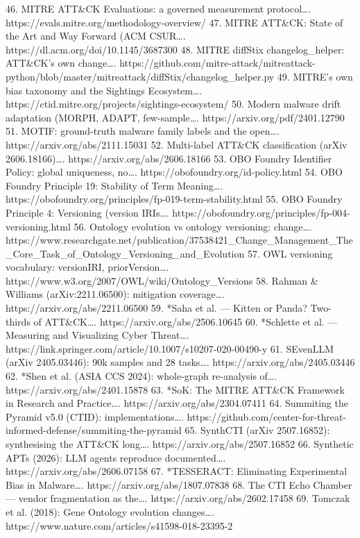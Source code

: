 \documentclass[11pt,a4paper]{article}
\begin{document}
46. MITRE ATT\&CK Evaluations: a governed measurement protocol…. https://evals.mitre.org/methodology-overview/
47. MITRE ATT\&CK: State of the Art and Way Forward (ACM CSUR…. https://dl.acm.org/doi/10.1145/3687300
48. MITRE diffStix changelog\_helper: ATT\&CK's own change…. https://github.com/mitre-attack/mitreattack-python/blob/master/mitreattack/diffStix/changelog\_helper.py
49. MITRE's own bias taxonomy and the Sightings Ecosystem…. https://ctid.mitre.org/projects/sightings-ecosystem/
50. Modern malware drift adaptation (MORPH, ADAPT, few-sample…. https://arxiv.org/pdf/2401.12790
51. MOTIF: ground-truth malware family labels and the open…. https://arxiv.org/abs/2111.15031
52. Multi-label ATT\&CK classification (arXiv 2606.18166)…. https://arxiv.org/abs/2606.18166
53. OBO Foundry Identifier Policy: global uniqueness, no…. https://obofoundry.org/id-policy.html
54. OBO Foundry Principle 19: Stability of Term Meaning…. https://obofoundry.org/principles/fp-019-term-stability.html
55. OBO Foundry Principle 4: Versioning (version IRIs…. https://obofoundry.org/principles/fp-004-versioning.html
56. Ontology evolution vs ontology versioning: change…. https://www.researchgate.net/publication/37538421\_Change\_Management\_The\_Core\_Task\_of\_Ontology\_Versioning\_and\_Evolution
57. OWL versioning vocabulary: versionIRI, priorVersion…. https://www.w3.org/2007/OWL/wiki/Ontology\_Versions
58. Rahman \& Williams (arXiv:2211.06500): mitigation coverage…. https://arxiv.org/abs/2211.06500
59. *Saha et al. — Kitten or Panda? Two-thirds of ATT\&CK…. https://arxiv.org/abs/2506.10645
60. *Schlette et al. — Measuring and Visualizing Cyber Threat…. https://link.springer.com/article/10.1007/s10207-020-00490-y
61. SEvenLLM (arXiv 2405.03446): 90k samples and 28 tasks…. https://arxiv.org/abs/2405.03446
62. *Shen et al. (ASIA CCS 2024): whole-graph re-analysis of…. https://arxiv.org/abs/2401.15878
63. *SoK: The MITRE ATT\&CK Framework in Research and Practice…. https://arxiv.org/abs/2304.07411
64. Summiting the Pyramid v5.0 (CTID): implementations…. https://github.com/center-for-threat-informed-defense/summiting-the-pyramid
65. SynthCTI (arXiv 2507.16852): synthesising the ATT\&CK long…. https://arxiv.org/abs/2507.16852
66. Synthetic APTs (2026): LLM agents reproduce documented…. https://arxiv.org/abs/2606.07158
67. *TESSERACT: Eliminating Experimental Bias in Malware…. https://arxiv.org/abs/1807.07838
68. The CTI Echo Chamber — vendor fragmentation as the…. https://arxiv.org/abs/2602.17458
69. Tomczak et al. (2018): Gene Ontology evolution changes…. https://www.nature.com/articles/s41598-018-23395-2
\end{document}
